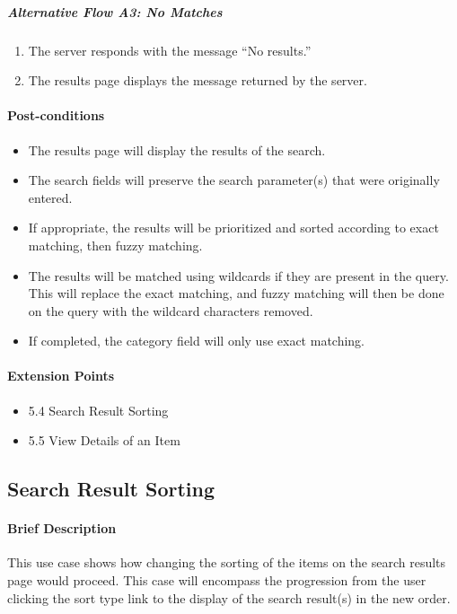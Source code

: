 \documentclass{article}
\begin{document}
\subparagraph{Alternative Flow A3: No Matches}
\begin{enumerate}
\item The server responds with the message ``No results.''
\item The results page displays the message returned by the server.
\end{enumerate}

\paragraph{Post-conditions}
\begin{itemize}
\item The results page will display the results of the search.
\item The search fields will preserve the search parameter(s) that were originally entered.
\item If appropriate, the results will be prioritized and sorted according to exact matching, then fuzzy matching.
\item The results will be matched using wildcards if they are present in the query.  This will replace the exact matching, and fuzzy matching will then be done on the query with the wildcard characters removed.
\item If completed, the category field will only use exact matching.
\end{itemize}

\paragraph{Extension Points}
\begin{itemize}
\item 5.4 Search Result Sorting
\item 5.5 View Details of an Item
\end{itemize}


\subsection{Search Result Sorting}

\paragraph{Brief Description}
This use case shows how changing the sorting of the items on the search results page would proceed. This case will encompass the progression from the user clicking the sort type link to the display of the search result(s) in the new order.
\end{document}
